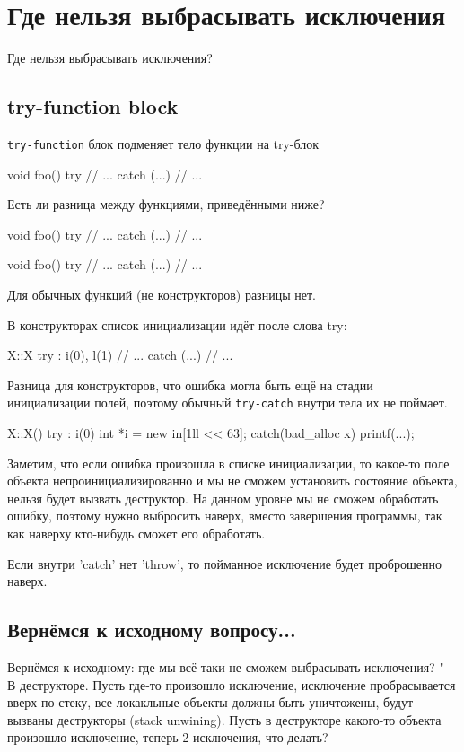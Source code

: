 \section{Где нельзя выбрасывать исключения}

Где нельзя выбрасывать исключения?
\subsection{try-function block}

\verb'try-function' блок подменяет тело функции на try-блок
\begin{cppcode}
void foo() try {
		// ...
	} catch (...) {
		// ...
}
\end{cppcode}

Есть ли разница между функциями, приведёнными ниже?
\begin{cppcode}
void foo() try {
		// ...
	} catch (...) {
		// ...
	}

void foo() {
	try {
		// ...
	} catch (...) {
		// ...
	}
}
\end{cppcode}
Для обычных функций (не конструкторов) разницы нет.

В конструкторах список инициализации идёт после слова try:
\begin{cppcode}
X::X try : i(0), l(1) {
		// ...
	} catch (...) {
		// ...
}
\end{cppcode}
Разница для конструкторов, что ошибка могла быть ещё на стадии инициализации полей,
поэтому обычный \verb'try-catch' внутри тела их не поймает.
\begin{cppcode}
X::X() try : i(0) {
        int *i = new in[1ll << 63];
    } catch(bad_alloc x) {
        printf(...);
}
\end{cppcode}

Заметим, что если ошибка произошла в списке инициализации, то какое-то поле объекта непроинициализированно и
мы не сможем установить состояние объекта, нельзя будет вызвать деструктор.
На данном уровне мы не сможем обработать ошибку, поэтому нужно выбросить наверх, вместо завершения программы,
так как наверху кто-нибудь сможет его обработать.

Если внутри \cpp'catch' нет \cpp'throw', то пойманное исключение будет проброшенно наверх.

\subsection{Вернёмся к исходному вопросу...}
Вернёмся к исходному: где мы всё-таки не сможем выбрасывать исключения? "--- В деструкторе.
Пусть где-то произошло исключение, исключение пробрасывается вверх по стеку, все локакльные объекты должны быть уничтожены,
будут вызваны деструкторы (stack unwining). Пусть в деструкторе какого-то объекта произошло исключение, теперь 2 исключения, что делать?
